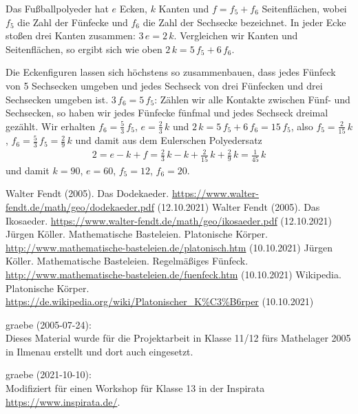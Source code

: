\documentclass[11pt]{article}
\begin{document}
Das Fußballpolyeder hat $e$ Ecken, $k$ Kanten und $f=f_5+f_6$ Seitenflächen,
wobei $f_5$ die Zahl der Fünfecke und $f_6$ die Zahl der Sechsecke bezeichnet.
In jeder Ecke stoßen drei Kanten zusammen: $3\,e=2\,k$.  Vergleichen wir
Kanten und Seitenflächen, so ergibt sich wie oben $2\,k=5\,f_5+6\,f_6$.

Die Eckenfiguren lassen sich höchstens so zusammenbauen, dass jedes Fünfeck
von 5 Sechsecken umgeben und jedes Sechseck von drei Fünfecken und drei
Sechsecken umgeben ist.  $3\,f_6=5\,f_5$: Zählen wir alle Kontakte zwischen
Fünf- und Sechsecken, so haben wir jedes Fünfecke fünfmal und jedes Sechseck
dreimal gezählt.  Wir erhalten $f_6=\frac53\,f_5$, $e=\frac23\,k$ und
$2\,k=5\,f_5+6\,f_6=15\,f_5$, also $f_5=\frac{2}{15}\,k$,
$f_6=\frac53\,f_5=\frac{2}{9}\,k$ und damit aus dem Eulerschen Polyedersatz
\begin{gather*}
  2=e-k+f=\frac23\,k-k+\frac{2}{15}\,k+\frac{2}{9}\,k=\frac{1}{45}\,k
\end{gather*}
und damit $k=90$, $e=60$, $f_5=12$, $f_6=20$. 


\begin{thebibliography}{xxx}
 Walter Fendt (2005). Das Dodekaeder.
  \url{https://www.walter-fendt.de/math/geo/dodekaeder.pdf} (12.10.2021) 
 Walter Fendt (2005). Das Ikosaeder.
  \url{https://www.walter-fendt.de/math/geo/ikosaeder.pdf} (12.10.2021) 
 Jürgen Köller. Mathematische Basteleien.
  Platonische Körper.\\
  \url{http://www.mathematische-basteleien.de/platonisch.htm} (10.10.2021)
 Jürgen Köller. Mathematische Basteleien.
  Regelmäßiges Fünfeck.\\
  \url{http://www.mathematische-basteleien.de/fuenfeck.htm} (10.10.2021)
 Wikipedia. Platonische Körper.\\ 
  \url{https://de.wikipedia.org/wiki/Platonischer_K%C3%B6rper} (10.10.2021)
\end{thebibliography}

\begin{attribution}
graebe (2005-07-24):\\ Dieses Material wurde für die Projektarbeit in Klasse
11/12 fürs Mathelager 2005 in Ilmenau erstellt und dort auch eingesetzt.

graebe (2021-10-10):\\ Modifiziert für einen Workshop für Klasse 13 in der
Inspirata \url{https://www.inspirata.de/}.

\end{attribution}
\end{document}

